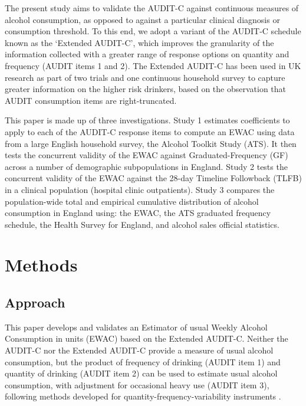 \documentclass[]{article}
\begin{document}
The present study aims to validate the AUDIT-C against continuous
measures of alcohol consumption, as opposed to against a particular
clinical diagnosis or consumption threshold. To this end, we adopt a
variant of the AUDIT-C schedule known as the `Extended AUDIT-C', which
improves the granularity of the information collected with a greater
range of response options on quantity and frequency (AUDIT items 1 and
2). The Extended AUDIT-C has been used in UK research as part of two
trials \citep{Kaner2013c, Crane2018} and one continuous household survey
\citep{Beard2015a} to capture greater information on the higher risk
drinkers, based on the observation that AUDIT consumption items are
right-truncated.

This paper is made up of three investigations. Study 1 estimates
coefficients to apply to each of the AUDIT-C response items to compute
an EWAC using data from a large English household survey, the Alcohol
Toolkit Study (ATS). It then tests the concurrent validity of the EWAC
against Graduated-Frequency (GF) across a number of demographic
subpopulations in England. Study 2 tests the concurrent validity of the
EWAC against the 28-day Timeline Followback (TLFB) in a clinical
population (hospital clinic outpatients). Study 3 compares the
population-wide total and empirical cumulative distribution of alcohol
consumption in England using: the EWAC, the ATS graduated frequency
schedule, the Health Survey for England, and alcohol sales official
statistics.

\hypertarget{methods}{%
\section{Methods}\label{methods}}

\hypertarget{approach}{%
\subsection{Approach}\label{approach}}

This paper develops and validates an Estimator of usual Weekly Alcohol
Consumption in units (EWAC) based on the Extended AUDIT-C. Neither the
AUDIT-C nor the Extended AUDIT-C provide a measure of usual alcohol
consumption, but the product of frequency of drinking (AUDIT item 1) and
quantity of drinking (AUDIT item 2) can be used to estimate usual
alcohol consumption, with adjustment for occasional heavy use (AUDIT
item 3), following methods developed for quantity-frequency-variability
instruments \citep{Lemmens1992}.
\end{document}
